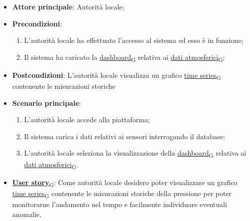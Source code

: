 \begin{itemize}
	\item \textbf{Attore principale}: Autorità locale;
	\item \textbf{Precondizioni}:
	      \begin{enumerate}
		      \item L'autorità locale ha effettuato l'accesso al sistema ed esso è in funzione;
		      \item Il sistema ha caricato la \href{https://7last.github.io/docs/rtb/documentazione-interna/glossario\#dashboard}{dashboard\textsubscript{G}} relativa ai \href{https://7last.github.io/docs/rtb/documentazione-interna/glossario\#dati-atmosferici}{dati atmosferici\textsubscript{G}};
	      \end{enumerate}
	\item \textbf{Postcondizioni}: L'autorità locale visualizza un grafico \href{https://7last.github.io/docs/rtb/documentazione-interna/glossario\#time-series}{time series\textsubscript{G}} contenente le misurazioni storiche
	\item \textbf{Scenario principale}:
	      \begin{enumerate}
		      \item L'autorità locale accede alla piattaforma;
		      \item Il sistema carica i dati relativi ai sensori interrogando il database;
		      \item L'autorità locale seleziona la visualizzazione della \href{https://7last.github.io/docs/rtb/documentazione-interna/glossario\#dashboard}{dashboard\textsubscript{G}} relativa ai \href{https://7last.github.io/docs/rtb/documentazione-interna/glossario\#dati-atmosferici}{dati atmosferici\textsubscript{G}}.
	      \end{enumerate}
	\item \href{https://7last.github.io/docs/rtb/documentazione-interna/glossario\#user-story}{\textbf{User story}\textsubscript{G}}: Come autorità locale desidero poter visualizzare un grafico \href{https://7last.github.io/docs/rtb/documentazione-interna/glossario\#time-series}{time series\textsubscript{G}} contenente le misurazioni storiche della pressione
	      per poter monitorarne l'andamento nel tempo e facilmente individuare eventuali anomalie.
\end{itemize}


